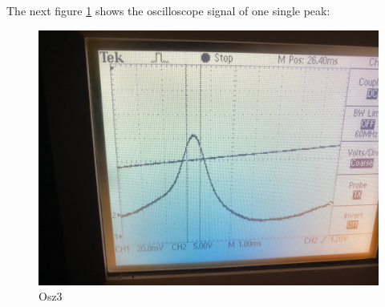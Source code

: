 \documentclass{article}
\begin{document}

The next figure \ref{Osz3} shows the oscilloscope signal of one single peak:
\begin{figure}
\includegraphics[width=\textwidth]{oszilloskopbild 3.jpg}
\caption{Osz3}
\label{Osz3}
\end{figure}
\end{document}
